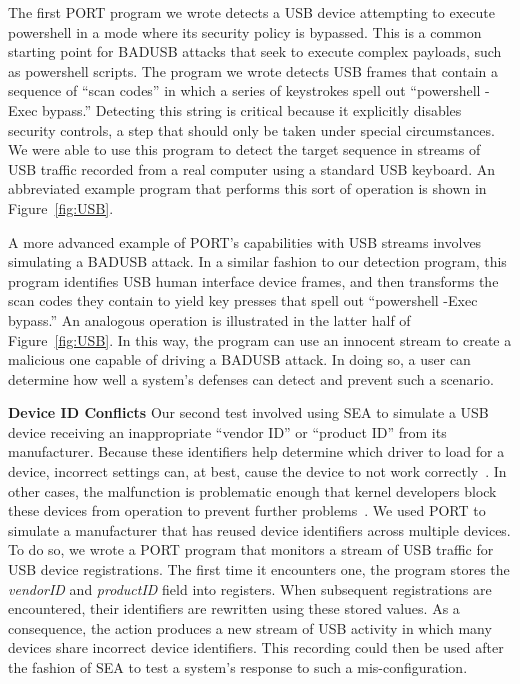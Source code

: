 The first PORT program we wrote detects a USB device attempting to execute
powershell in a mode where its security policy is bypassed.
This is a common starting point for BADUSB attacks that seek to execute complex payloads, such as powershell scripts.
The program we wrote detects USB frames that contain a sequence of ``scan codes'' in which a series of keystrokes spell out ``powershell -Exec bypass.''
Detecting this string is critical because it explicitly disables security controls, a step that should only be taken under special circumstances.
We were able to use this program to detect the target sequence in streams of USB traffic recorded from a real computer using a standard USB keyboard.  An abbreviated example program that performs this sort of operation is shown in Figure~\ref{fig:USB}.

A more advanced example of PORT's capabilities with USB streams involves simulating a BADUSB attack.
In a similar fashion to our detection program, this program identifies USB human interface device frames, and then transforms the scan codes they contain to yield key presses that spell out ``powershell -Exec bypass.''
An analogous operation is illustrated in the latter half of Figure~\ref{fig:USB}.
In this way, the program can use an innocent stream to create a malicious one capable of driving a BADUSB attack. In doing so, a user can determine how well a system's defenses can detect and prevent such a scenario.

\textbf{Device ID Conflicts} Our second test involved using SEA to simulate a USB device receiving an inappropriate ``vendor ID'' or ``product ID'' from its manufacturer.
Because these identifiers help determine which driver to load for a device,
incorrect settings can, at best, cause the device to not work correctly~\cite{wrongid}.
In other cases,
the malfunction is problematic enough that kernel developers block these devices from operation to prevent further problems~\cite{barscannerbug}.
We used PORT to simulate a manufacturer that has reused device identifiers across multiple devices.
To do so, we wrote a PORT program that monitors a stream of USB traffic for USB device registrations.
The first time it encounters one, the program stores the \textit{vendorID} and \textit{productID} field into registers.
When subsequent registrations are encountered,
their identifiers are rewritten using these stored values.
As a consequence, the action produces a new stream of USB activity in which many devices share incorrect device identifiers. 
This recording could then be used after the fashion of SEA to test a system's response to such a mis-configuration.

